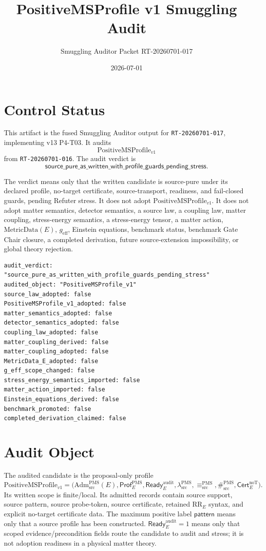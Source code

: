 \documentclass[11pt]{article}
\title{PositiveMSProfile v1 Smuggling Audit}
\author{Smuggling Auditor Packet RT-20260701-017}
\date{2026-07-01}
\newcommand{\PMSProf}{\mathrm{PositiveMSProfile}_{v1}}
\newcommand{\AdmPMS}{\mathrm{Adm}^{\mathrm{PMS}}_{\mathrm{src}}}
\newcommand{\Prof}{\mathsf{Prof}^{\mathrm{PMS}}_E}
\newcommand{\Ready}{\mathsf{Ready}^{\mathrm{audit}}_E}
\newcommand{\Cert}{\mathsf{Cert}^{\mathrm{noT}}_E}
\newcommand{\lambdaProf}{\lambda^{\mathrm{PMS}}_{\mathrm{src}}}
\newcommand{\EqProf}{\equiv^{\mathrm{PMS}}_{\mathrm{src}}}
\newcommand{\SepProf}{\#^{\mathrm{PMS}}_{\mathrm{src}}}
\newcommand{\Pattern}{\mathsf{pattern}}
\newcommand{\RRE}{\mathrm{RR}_E}
\newcommand{\MetricData}{\mathrm{MetricData}}
\newcommand{\geff}{g_{\mathrm{eff}}}
\newcommand{\AuditVerdict}{\mathsf{source\_pure\_as\_written\_with\_profile\_guards\_pending\_stress}}
\begin{document}
\maketitle

\section{Control Status}

This artifact is the fused Smuggling Auditor output for
\texttt{RT-20260701-017}, implementing v13 P4-T03. It audits
\[
  \PMSProf
\]
from \texttt{RT-20260701-016}. The audit verdict is
\[
  \AuditVerdict.
\]

The verdict means only that the written candidate is source-pure under its
declared profile, no-target certificate, source-transport, readiness, and
fail-closed guards, pending Refuter stress. It does not adopt
\(\PMSProf\). It does not adopt matter semantics, detector semantics, a
source law, a coupling law, matter coupling, stress-energy semantics, a
stress-energy tensor, a matter action, \(\MetricData(E)\), \(\geff\),
Einstein equations, benchmark status, benchmark Gate Chair closure, a
completed derivation, future source-extension impossibility, or global theory
rejection.

\begin{verbatim}
audit_verdict: "source_pure_as_written_with_profile_guards_pending_stress"
audited_object: "PositiveMSProfile_v1"
source_law_adopted: false
PositiveMSProfile_v1_adopted: false
matter_semantics_adopted: false
detector_semantics_adopted: false
coupling_law_adopted: false
matter_coupling_derived: false
matter_coupling_adopted: false
MetricData_E_adopted: false
g_eff_scope_changed: false
stress_energy_semantics_imported: false
matter_action_imported: false
Einstein_equations_derived: false
benchmark_promoted: false
completed_derivation_claimed: false
\end{verbatim}

\section{Audit Object}

The audited candidate is the proposal-only profile
\[
  \PMSProf =
  \bigl(\AdmPMS(E),\Prof,\Ready,\lambdaProf,\EqProf,\SepProf,\Cert\bigr).
\]
Its written scope is finite/local. Its admitted records contain source
support, source pattern, source probe-token, source certificate, retained
\(\RRE\) syntax, and explicit no-target certificate data. The maximum positive
label \(\Pattern\) means only that a source profile has been constructed.
\(\Ready=1\) means only that scoped evidence/precondition fields route the
candidate to audit and stress; it is not adoption readiness in a physical
matter theory.
\end{document}
